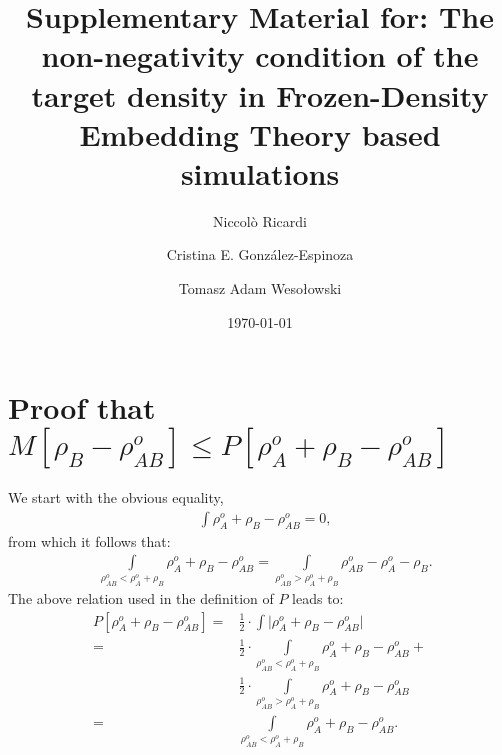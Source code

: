 \documentclass[amsmath,amssymb,preprint,aip,jcp]{revtex4-1}
\begin{document}
\author{Niccol\`{o} Ricardi}
\author{Cristina E. Gonz\'{a}lez-Espinoza}
\author{Tomasz Adam Weso\l{}owski}
% 
\date{\today}
\title{Supplementary Material for: The non-negativity condition of the target density in Frozen-Density Embedding Theory based simulations}

\maketitle
\section{Proof that $M[\rho_{B} - \rho^{o}_{AB}] \leq P[\rho_A^o+\rho_B - \rho_{AB}^{o}] $}
We start with the obvious equality,
\begin{align}
 & \int \rho^{o}_A + \rho_B - \rho_{AB}^o = 0, %
\end{align}
from which it follows that:
\begin{align}
 & \int\limits_{\rho_{AB}^o < \rho^{o}_A + \rho_B}\rho^{o}_A + \rho_B - \rho_{AB}^o = \int\limits_{\rho_{AB}^o > \rho^{o}_A + \rho_B}\rho_{AB}^o - \rho^{o}_A - \rho_B.
\end{align}
The above relation used in the definition of $P$ leads to:
\begin{align}\label{eq:P_alternatives}
P[\rho^{o}_A + \rho_B - \rho_{AB}^o] = & \frac{1}{2} \cdot \int \vert \rho^{o}_A + \rho_B - \rho_{AB}^o \vert \\ \nonumber
 = & \frac{1}{2} \cdot \int\limits_{\rho_{AB}^o <\rho^{o}_A + \rho_B}\rho^{o}_A + \rho_B - \rho_{AB}^o + \\ \nonumber
 & \frac{1}{2} \cdot \int\limits_{\rho_{AB}^o > \rho^{o}_A + \rho_B}\rho^{o}_A + \rho_B - \rho_{AB}^o \\ \nonumber
= & \int\limits_{\rho_{AB}^o <\rho^{o}_A + \rho_B}\rho^{o}_A + \rho_B - \rho_{AB}^o.
\end{align}
\end{document}
